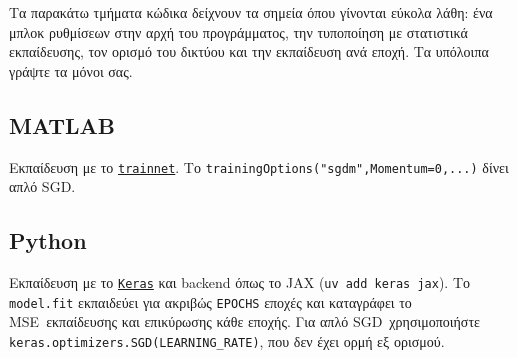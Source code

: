 \documentclass[11pt]{article}
\newcommand{\doc}[2]{\href{#1}{\texttt{\textlatin{#2}}}}
\newcommand{\code}[1]{\texttt{\textlatin{#1}}}
\newcommand{\MSE}{\textlatin{MSE}}
\newcommand{\SGD}{\textlatin{SGD}}
\newcommand{\MATLAB}{\textlatin{MATLAB}}
\newcommand{\Python}{\textlatin{Python}}
\begin{document}
\noindent Τα παρακάτω τμήματα κώδικα δείχνουν τα σημεία όπου γίνονται εύκολα λάθη: ένα μπλοκ ρυθμίσεων στην αρχή του προγράμματος, την τυποποίηση με στατιστικά εκπαίδευσης, τον ορισμό του δικτύου και την εκπαίδευση ανά εποχή. Τα υπόλοιπα γράψτε τα μόνοι σας.

\subsection{\MATLAB}
Εκπαίδευση με το \doc{https://www.mathworks.com/help/deeplearning/ref/trainnet.html}{trainnet}. Το \code{trainingOptions("sgdm",Momentum=0,...)} δίνει απλό \SGD.
\begin{otherlanguage}{english}

\end{otherlanguage}

\bigskip
\subsection{\Python}
Εκπαίδευση με το \doc{https://keras.io/getting_started/}{Keras} και \textlatin{backend} όπως το \textlatin{JAX} (\code{uv add keras jax}). Το \code{model.fit} εκπαιδεύει για ακριβώς \code{EPOCHS} εποχές και καταγράφει το \MSE\ εκπαίδευσης και επικύρωσης κάθε εποχής. Για απλό \SGD\ χρησιμοποιήστε \code{keras.optimizers.SGD(LEARNING\_RATE)}, που δεν έχει ορμή εξ ορισμού.
\begin{otherlanguage}{english}

\end{otherlanguage}
\end{document}
